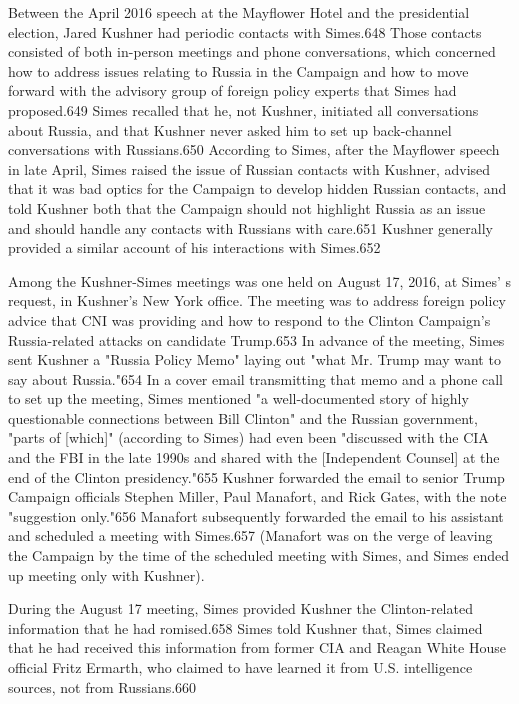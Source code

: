 Between the April 2016 speech at the Mayflower Hotel and the presidential election, Jared Kushner had periodic contacts with Simes.648 Those contacts consisted of both in-person meetings and phone conversations,  which concerned how to address issues relating to Russia in the Campaign and how to move forward with the advisory group of foreign policy experts that Simes had proposed.649 Simes recalled that he, not Kushner, initiated all conversations about Russia, and that Kushner never asked him to set up back-channel conversations with Russians.650 According to Simes, after the Mayflower speech in late April, Simes raised the issue of Russian contacts with Kushner, advised that it was bad optics for the Campaign to develop hidden Russian contacts, and told Kushner both that the Campaign should not highlight Russia as an issue and should handle any contacts with Russians with care.651 Kushner generally provided a  similar account of his interactions with Simes.652

Among the Kushner-Simes meetings was one held on August 17, 2016, at Simes' s request, in Kushner's New York office. The meeting was to address foreign policy advice that CNI was providing and how to respond to the Clinton Campaign's Russia-related  attacks on candidate Trump.653 In advance of the meeting,  Simes sent Kushner a  "Russia Policy Memo" laying out "what Mr. Trump may want to say about Russia."654 In a cover email transmitting that memo and a  phone call to set up the meeting,  Simes mentioned "a well-documented story of highly questionable connections between Bill Clinton" and the Russian government, "parts of [which]" (according to Simes) had even been "discussed with the CIA and the FBI in the late 1990s and shared with the [Independent Counsel] at the end of the Clinton presidency."655 Kushner forwarded the email to senior Trump Campaign officials Stephen Miller, Paul Manafort, and Rick Gates,  with the note "suggestion only."656 Manafort subsequently forwarded the email to his assistant and scheduled a  meeting with Simes.657 (Manafort was on the verge of leaving the Campaign by the time of the scheduled meeting with Simes, and Simes ended up meeting only with Kushner).

During the August 17 meeting,  Simes provided Kushner the Clinton-related information that he had romised.658 Simes told Kushner that, Simes claimed that he had received this information from former CIA and Reagan White House official Fritz Ermarth, who claimed to have learned it from U.S. intelligence sources, not from Russians.660

